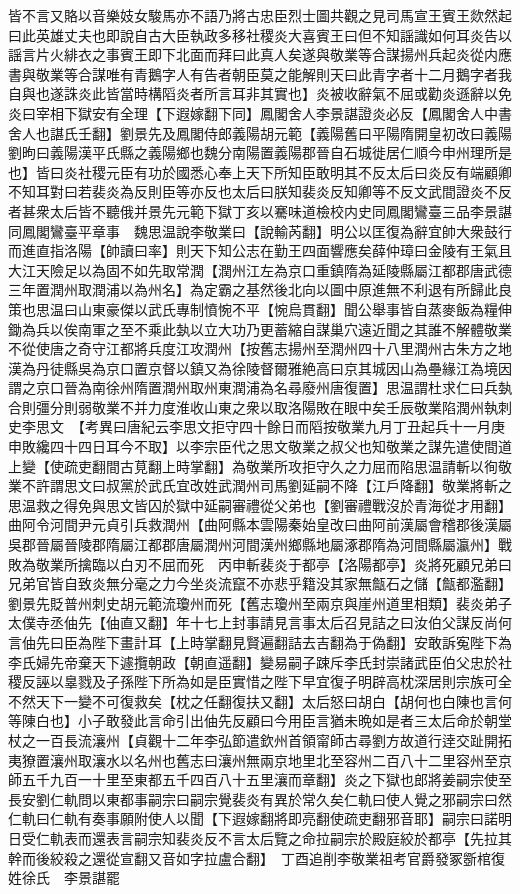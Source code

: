 皆不言又賂以音樂妓女駿馬亦不語乃將古忠臣烈士圖共觀之見司馬宣王賓王欻然起曰此英雄丈夫也即說自古大臣執政多移社稷炎大喜賓王曰但不知謡識如何耳炎告以謡言片火緋衣之事賓王即下北面而拜曰此真人矣遂與敬業等合謀揚州兵起炎從内應書與敬業等合謀唯有青鵝字人有告者朝臣莫之能解則天曰此青字者十二月鵝字者我自與也遂誅炎此皆當時構䧟炎者所言耳非其實也】炎被收辭氣不屈或勸炎遜辭以免炎曰宰相下獄安有全理【下遐嫁翻下同】鳳閣舍人李景諶證炎必反【鳳閣舍人中書舍人也諶氏壬翻】劉景先及鳳閣侍郎義陽胡元範【義陽舊曰平陽隋開皇初改曰義陽劉昫曰義陽漢平氏縣之義陽鄉也魏分南陽置義陽郡晉自石城徙居仁順今申州理所是也】皆曰炎社稷元臣有功於國悉心奉上天下所知臣敢明其不反太后曰炎反有端顧卿不知耳對曰若裴炎為反則臣等亦反也太后曰朕知裴炎反知卿等不反文武間證炎不反者甚衆太后皆不聽俄并景先元範下獄丁亥以騫味道檢校内史同鳳閣鸞臺三品李景諶同鳳閣鸞臺平章事　魏思温說李敬業曰【說輸芮翻】明公以匡復為辭宜帥大衆鼓行而進直指洛陽【帥讀曰率】則天下知公志在勤王四面響應矣薛仲璋曰金陵有王氣且大江天險足以為固不如先取常潤【潤州江左為京口重鎮隋為延陵縣屬江都郡唐武德三年置潤州取潤浦以為州名】為定霸之基然後北向以圖中原進無不利退有所歸此良策也思温曰山東豪傑以武氏專制憤惋不平【惋烏貫翻】聞公舉事皆自蒸麥飯為糧伸鋤為兵以俟南軍之至不乘此埶以立大功乃更蓄縮自謀巢穴遠近聞之其誰不解體敬業不從使唐之奇守江都將兵度江攻潤州【按舊志揚州至潤州四十八里潤州古朱方之地漢為丹徒縣吳為京口置京督以鎮又為徐陵督爾雅絶高曰京其城因山為壘緣江為境因謂之京口晉為南徐州隋置潤州取州東潤浦為名尋廢州唐復置】思温謂杜求仁曰兵埶合則彊分則弱敬業不并力度淮收山東之衆以取洛陽敗在眼中矣壬辰敬業陷潤州執刺史李思文　【考異曰唐紀云李思文拒守四十餘日而䧟按敬業九月丁丑起兵十一月庚申敗纔四十四日耳今不取】以李宗臣代之思文敬業之叔父也知敬業之謀先遣使間道上變【使疏吏翻間古莧翻上時掌翻】為敬業所攻拒守久之力屈而陷思温請斬以徇敬業不許謂思文曰叔黨於武氏宜改姓武潤州司馬劉延嗣不降【江戶降翻】敬業將斬之思温救之得免與思文皆囚於獄中延嗣審禮從父弟也【劉審禮戰沒於青海從才用翻】曲阿令河間尹元貞引兵救潤州【曲阿縣本雲陽秦始皇改曰曲阿前漢屬會稽郡後漢屬吳郡晉屬晉陵郡隋屬江都郡唐屬潤州河間漢州鄉縣地屬涿郡隋為河間縣屬瀛州】戰敗為敬業所擒臨以白刃不屈而死　丙申斬裴炎于都亭【洛陽都亭】炎將死顧兄弟曰兄弟官皆自致炎無分毫之力今坐炎流竄不亦悲乎籍没其家無甔石之儲【甔都濫翻】劉景先貶普州刺史胡元範流瓊州而死【舊志瓊州至兩京與崖州道里相類】裴炎弟子太僕寺丞伷先【伷直又翻】年十七上封事請見言事太后召見詰之曰汝伯父謀反尚何言伷先曰臣為陛下畫計耳【上時掌翻見賢遍翻詰去吉翻為于偽翻】安敢訴寃陛下為李氏婦先帝棄天下遽攬朝政【朝直遥翻】變易嗣子踈斥李氏封崇諸武臣伯父忠於社稷反誣以辠戮及子孫陛下所為如是臣實惜之陛下早宜復子明辟高枕深居則宗族可全不然天下一變不可復救矣【枕之任翻復扶又翻】太后怒曰胡白【胡何也白陳也言何等陳白也】小子敢發此言命引出伷先反顧曰今用臣言猶未晩如是者三太后命於朝堂杖之一百長流瀼州【貞觀十二年李弘節遣欽州首領甯師古尋劉方故道行逹交趾開拓夷獠置瀼州取瀼水以名州也舊志曰瀼州無兩京地里北至容州二百八十二里容州至京師五千九百一十里至東都五千四百八十五里瀼而章翻】炎之下獄也郎將姜嗣宗使至長安劉仁軌問以東都事嗣宗曰嗣宗覺裴炎有異於常久矣仁軌曰使人覺之邪嗣宗曰然仁軌曰仁軌有奏事願附使人以聞【下遐嫁翻將即亮翻使疏吏翻邪音耶】嗣宗曰諾明日受仁軌表而還表言嗣宗知裴炎反不言太后覽之命拉嗣宗於殿庭絞於都亭【先拉其幹而後絞殺之還從宣翻又音如字拉盧合翻】　丁酉追削李敬業祖考官爵發冢斵棺復姓徐氏　李景諶罷